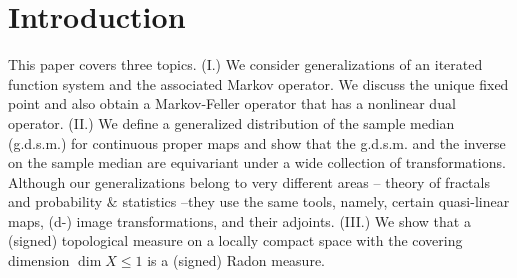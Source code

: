 \documentclass[sn-mathphys-num]{sn-jnl}%
\theoremstyle{thmstyleone}%
\theoremstyle{definition}
\begin{document}


\maketitle


\section{Introduction}

This paper covers three topics. (I.) We consider  generalizations of an iterated function system and the associated Markov operator. We    
discuss the unique fixed point and also obtain a Markov-Feller operator that has a nonlinear dual operator. 
(II.)  We define a generalized distribution of the sample median (g.d.s.m.) for continuous proper maps and show that the g.d.s.m. 
and the inverse on the sample median are equivariant under a wide collection of transformations. 
Although our generalizations belong to very different areas -- theory of fractals and probability $\&$ statistics --they use the same tools, 
namely, certain quasi-linear maps,  (d-) image transformations,  and their adjoints. 
(III.)  We show that a (signed) topological measure on a locally compact space with the covering dimension $\dim X \le 1$ is a (signed) Radon measure. 
\end{document}
